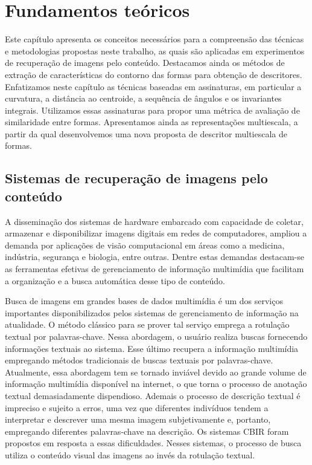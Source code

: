 
\chapter{Fundamentos teóricos\label{chap:FUNDA}}

Este capítulo apresenta os conceitos necessários para a compreensão das técnicas e metodologias propostas neste trabalho, as quais são aplicadas em experimentos de recuperação de imagens pelo conteúdo. Destacamos ainda os métodos de extração de características do contorno das formas para obtenção de descritores. Enfatizamos neste capítulo as técnicas baseadas em assinaturas, em particular a curvatura, a distância ao centroide, a sequência de ângulos e os invariantes integrais. Utilizamos essas assinaturas para propor uma métrica de avaliação de similaridade entre formas. Apresentamos ainda as representações multiescala, a partir da qual desenvolvemos uma nova proposta de descritor multiescala de formas.


\section{\label{chap:CBIR} Sistemas de recuperação de imagens pelo conteúdo}

A disseminação dos sistemas de hardware embarcado com capacidade de coletar, armazenar e disponibilizar imagens digitais em redes de computadores, ampliou a demanda por aplicações de visão computacional em áreas como a medicina, indústria, segurança e biologia, entre outras. Dentre estas  demandas destacam-se as ferramentas efetivas de gerenciamento de informação multimídia que facilitam a organização e a busca automática desse tipo de conteúdo. 

Busca de imagens em grandes bases de dados multimídia é um dos serviços importantes disponibilizados pelos sistemas de gerenciamento de informação na atualidade. O método clássico para se prover tal serviço emprega a rotulação textual por palavras-chave. Nessa abordagem, o usuário realiza buscas fornecendo informações textuais ao sistema. Esse último recupera a informação multimídia empregando métodos tradicionais de buscas textuais por palavras-chave. Atualmente, essa abordagem tem se tornado inviável devido ao grande volume de informação multimídia disponível na internet, o que torna o processo de anotação textual demasiadamente dispendioso. Ademais o processo de descrição textual é impreciso e sujeito a erros, uma vez que diferentes indivíduos tendem a interpretar e descrever uma mesma imagem subjetivamente e, portanto, empregando diferentes palavras-chave na descrição. Os sistemas  \ac{CBIR} foram propostos em resposta a essas dificuldades. Nesses sistemas, o processo de busca utiliza o conteúdo visual das imagens ao invés da rotulação textual. 


